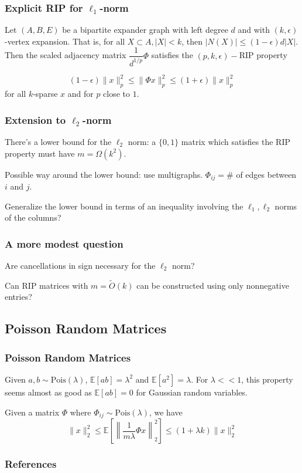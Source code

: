 \documentclass[aspectratio=34]{beamer}
\begin{document}
\begin{frame}
    \frametitle{Explicit RIP for $\ell_1$-norm}
    \begin{theorem}
    Let $(A,B,E)$ be a bipartite expander graph with left degree $d$ and with $(k,\epsilon)$-vertex expansion. That is, for all $X \subset A, |X| < k$, then $|N(X)| \le (1-\epsilon)d|X|$. Then the scaled adjacency matrix $\dfrac{1}{d^{1/p}}\Phi$ satisfies the $(p,k,\epsilon)-$RIP property
    
    \[(1-\epsilon)\|x\|_p^2 \le \|\Phi x\|_p^2 \le (1+\epsilon)\|x\|_p^2\]
    for all $k$-sparse $x$ and for $p$ close to $1$. 
	
    \end{theorem}	

\end{frame}

\begin{frame}
\frametitle{Extension to $\ell_2$-norm}
There's a lower bound for the $\ell_2$ norm: a $\{0,1\}$ matrix which satisfies the RIP property must have $m = \Omega(k^2)$. 

Possible way around the lower bound: use multigraphs. $\Phi_{ij} = \#$ of edges between $i$ and $j$. 

Generalize the lower bound in terms of an inequality involving the $\ell_1,\ell_2$ norms of the columns?

\end{frame}

%
\begin{frame}
\frametitle{A more modest question}
Are cancellations in sign necessary for the $\ell_2$ norm?

Can RIP matrices with $m = \tilde{O}(k)$ can be constructed using only nonnegative entries?
 
\end{frame}

\subsection{Poisson Random Matrices}
\begin{frame}
    \frametitle{Poisson Random Matrices}
    Given $a,b \sim \text{Pois}(\lambda)$, $\mathbb{E}[ab] = \lambda^2$ and $\mathbb{E}[a^2] = \lambda$.
    For $\lambda << 1$, this property seems almost as good as $\mathbb{E}[ab] = 0$ for Gaussian random variables. 
    
    \begin{Lemma}
    	
    Given a matrix $\Phi$ where $\Phi_{ij} \sim \text{Pois}(\lambda)$, we have
    \[\|x\|_2^2 \le \mathbb{E}\left[\left\|\frac{1}{m\lambda}\Phi x\right\|_2^2\right] \le (1+\lambda k)\|x\|_2^2\]	
    \end{Lemma}

\end{frame}

\begin{frame}[t,allowframebreaks]{}
\frametitle{References}



\end{frame}
\end{document}
